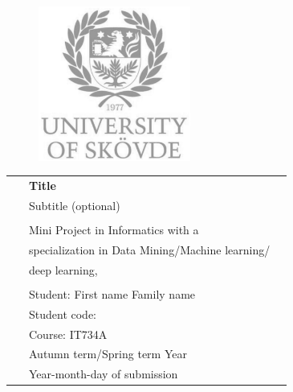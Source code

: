 \begin{center}

\vspace*{1cm}

\begin{figure}
  \raggedleft
  \begin{minipage}{4cm}
  \includegraphics[width=5cm]{images/logo.png}
  \end{minipage}
\end{figure}

\vspace*{2cm}

\vspace*{0.1in}

\begin{spacing}{1.7}

\begin{tabular}{p{4cm} ll}

& \textbf{\huge Title}\\ %
& \Large Subtitle (optional)\\ %
& \\
& \large Mini Project in Informatics with a \\
& \large specialization in Data Mining/Machine learning/ \\
& \large deep learning,  \\ 

& \\
& \large Student: First name Family name \\
& \large Student code: \\
& \large Course: IT734A \\
& \large Autumn term/Spring term Year \\\
& \large Year-month-day of submission 
\end{tabular}

\end{spacing}

\end{center}



\thispagestyle{empty} %
\clearpage\setcounter{page}{1} %
\pagenumbering{roman} %